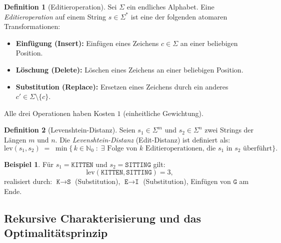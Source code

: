 ﻿\documentclass[a4paper,12pt]{article}
\theoremstyle{definition}
\newtheorem{definition}{Definition}
\newtheorem{beispiel}{Beispiel}
\begin{document}
\begin{definition}[Editieroperation]
    Sei $\Sigma$ ein endliches Alphabet. Eine \emph{Editieroperation} auf einem
    String $s \in \Sigma^*$ ist eine der folgenden atomaren Transformationen:
    \begin{itemize}
        \item \textbf{Einfügung (Insert):} Einfügen eines Zeichens $c \in \Sigma$
              an einer beliebigen Position.
        \item \textbf{Löschung (Delete):} Löschen eines Zeichens an einer
              beliebigen Position.
        \item \textbf{Substitution (Replace):} Ersetzen eines Zeichens durch
              ein anderes $c' \in \Sigma \setminus \{c\}$.
    \end{itemize}
    Alle drei Operationen haben Kosten $1$ (einheitliche Gewichtung).
\end{definition}

\begin{definition}[Levenshtein-Distanz]
    Seien $s_1 \in \Sigma^m$ und $s_2 \in \Sigma^n$ zwei Strings der Längen
    $m$ und $n$. Die \emph{Levenshtein-Distanz} (Edit-Distanz) ist definiert als:
    \[
        \mathrm{lev}(s_1, s_2) \;=\; \min\bigl\{\,k \in \mathbb{N}_0\;:\;
        \exists \text{ Folge von } k \text{ Editieroperationen, die }
        s_1 \text{ in } s_2 \text{ überführt}\bigr\}.
    \]
\end{definition}

\begin{beispiel}
    Für $s_1 = \texttt{KITTEN}$ und $s_2 = \texttt{SITTING}$ gilt:
    \[
        \mathrm{lev}(\texttt{KITTEN}, \texttt{SITTING}) = 3,
    \]
    realisiert durch: $\texttt{K} \to \texttt{S}$ (Substitution),
    $\texttt{E} \to \texttt{I}$ (Substitution),
    Einfügen von $\texttt{G}$ am Ende.
\end{beispiel}

\subsection{Rekursive Charakterisierung und das Optimalitätsprinzip}
\end{document}
